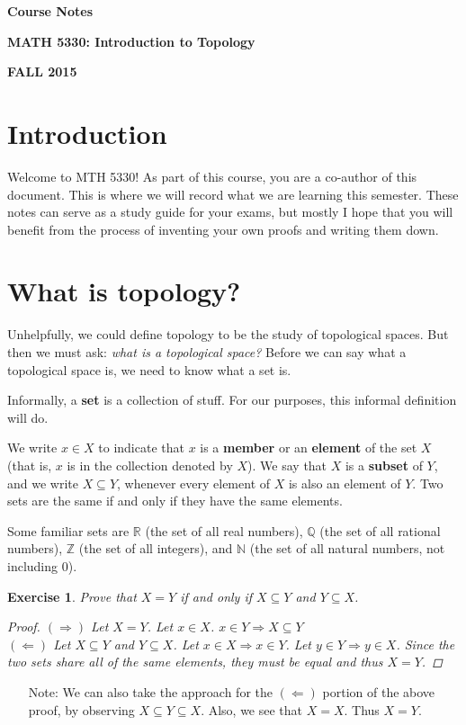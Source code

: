 \documentclass[12pt]{amsart}
\newtheorem{exercise}{Exercise}[section]
\theoremstyle{definition}
\theoremstyle{remark}
\newcommand{\Q}{\mathbb{Q}}
\newcommand{\R}{\mathbb{R}}
\newcommand{\N}{\mathbb{N}}
\newcommand{\Z}{\mathbb{Z}}
\newcommand{\0}{\emptyset}
\begin{document}
\begin{center}
\Large{\textbf{Course Notes}}

\large{\textbf{MATH 5330: Introduction to Topology}}

\large{\textbf{FALL 2015}}
\end{center}

\section{Introduction}

Welcome to MTH 5330! As part of this course, you are a co-author of this document. This is where we will record what we are learning this semester. These notes can serve as a study guide for your exams, but mostly I hope that you will benefit from the process of inventing your own proofs and writing them down.

\section{What is topology?}

Unhelpfully, we could define topology to be the study of topological spaces. But then we must ask: \textit{what is a topological space?} Before we can say what a topological space is, we need to know what a set is.

Informally, a \textbf{set} is a collection of stuff. For our purposes, this informal definition will do.

We write $x \in X$ to indicate that $x$ is a \textbf{member} or an \textbf{element} of the set $X$ (that is, $x$ is in the collection denoted by $X$). We say that $X$ is a \textbf{subset} of $Y$, and we write $X \subseteq Y$, whenever every element of $X$ is also an element of $Y$. Two sets are the same if and only if they have the same elements.

Some familiar sets are $\R$ (the set of all real numbers), $\Q$ (the set of all rational numbers), $\Z$ (the set of all integers), and $\N$ (the set of all natural numbers, not including $0$).

\begin{exercise}
Prove that $X = Y$ if and only if $X \subseteq Y$ and $Y \subseteq X$.
\begin{proof}
	$(\Rightarrow)$ Let $X=Y$. Let $x \in X$. $x \in Y \Rightarrow X \subseteq Y$
	\\$(\Leftarrow)$ Let $X \subseteq Y$ and $Y \subseteq X$. Let $x \in X \Rightarrow x \in Y$. Let $y \in Y \Rightarrow y \in X$. Since the two sets share all of the same elements, they must be equal and thus $X = Y$.
\end{proof}
\end{exercise}
\begin{itemize}
	\item[Note:] We can also take the approach for the $(\Leftarrow)$ portion of the above proof, by observing $X \subseteq Y \subseteq X$. Also, we see that $X = X$. Thus $X = Y$.
\end{itemize}
\end{document}

